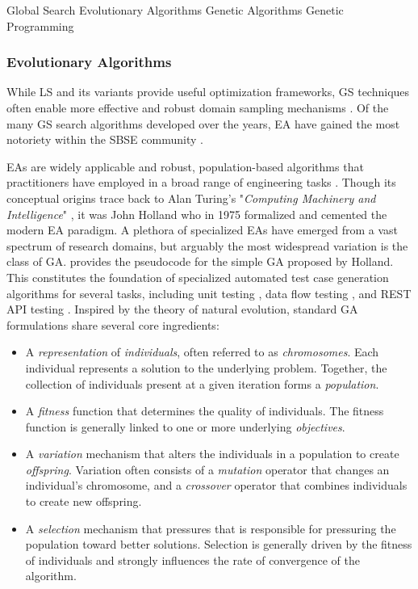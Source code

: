  {Global Search}
 {Evolutionary Algorithms}
 {Genetic Algorithms}
 {Genetic Programming}

\subsubsection{Evolutionary Algorithms}

While \gls{LS} and its variants
provide useful optimization frameworks, \Gls{GS} techniques often
enable more effective and robust domain sampling mechanisms \cite{mcminn2004search}.
Of the many \gls{GS} search algorithms developed over the years, \Gls{EA} have gained
the most notoriety within the \gls{SBSE} community \cite{harman2011software}.

\gls{EA}s are widely applicable and robust, population-based algorithms
that practitioners have employed in a broad range of engineering tasks \cite{harman2011software}.
Though its conceptual origins trace back to Alan Turing's "\textit{Computing Machinery and Intelligence}" \cite{turing1950computing}, it was John Holland \cite{jh1975adaptation}
who in 1975 formalized and cemented the modern \gls{EA} paradigm.
A plethora of specialized \gls{EA}s have emerged from a vast spectrum of 
research domains, but arguably the most widespread variation is the
class of \Gls{GA}.
 provides the pseudocode for the simple \gls{GA}
proposed by Holland.
This constitutes the foundation of specialized automated test case generation algorithms
for several tasks, including unit testing 
\cite{tonella2004evolutionary, panichella2017automated},
data flow testing \cite{girgis2005automatic}, and REST API testing
\cite{arcuri2019restful}.
Inspired by the theory of natural evolution,
standard \gls{GA} formulations share several core ingredients:
\begin{itemize}
\item A \textit{representation} of \textit{individuals},
	often referred to as \textit{chromosomes}.
	Each individual represents a solution to the underlying
	problem.
	Together, the collection of individuals present at
	a given iteration forms a \textit{population}.

\item A \textit{fitness} function that determines
	the quality of individuals. 
	The fitness function is generally linked
	to one or more underlying \textit{objectives}.

\item A \textit{variation} mechanism that alters
	the individuals in a population to create \textit{offspring}.
	Variation often consists of a \textit{mutation} operator
	that changes an individual's chromosome, and a \textit{crossover}
	operator that combines individuals to create new offspring.
	
\item A \textit{selection} mechanism that pressures that is responsible
	for pressuring the population toward better solutions. Selection
	is generally driven by the fitness of individuals and strongly
	influences the rate of convergence of the algorithm.
\end{itemize}

